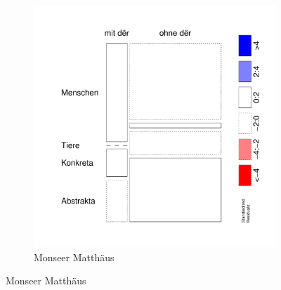 \begin{figure}
\begin{subfigure}[b]{.5\linewidth}
  \includegraphics[height=.25\textheight]{generated/images/residuals-bel-M}
\caption {Monseer Matthäus}
\end{subfigure}


\end{figure}
